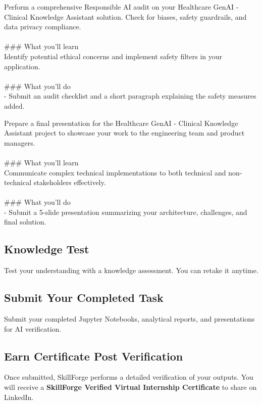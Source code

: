 \documentclass{article}
\begin{document}
Perform a comprehensive Responsible AI audit on your Healthcare GenAI - Clinical Knowledge Assistant solution. Check for biases, safety guardrails, and data privacy compliance. \\
 \\
### What you'll learn \\
Identify potential ethical concerns and implement safety filters in your application. \\
 \\
### What you'll do \\
- Submit an audit checklist and a short paragraph explaining the safety measures added.

Prepare a final presentation for the Healthcare GenAI - Clinical Knowledge Assistant project to showcase your work to the engineering team and product managers. \\
 \\
### What you'll learn \\
Communicate complex technical implementations to both technical and non-technical stakeholders effectively. \\
 \\
### What you'll do \\
- Submit a 5-slide presentation summarizing your architecture, challenges, and final solution.

\subsection*{Knowledge Test}
Test your understanding with a knowledge assessment. You can retake it anytime.\\

\subsection*{Submit Your Completed Task}
Submit your completed Jupyter Notebooks, analytical reports, and presentations for AI verification.\\

\subsection*{Earn Certificate Post Verification}
Once submitted, SkillForge performs a detailed verification of your outputs. You will receive a \textbf{SkillForge Verified Virtual Internship Certificate} to share on LinkedIn.\\
\end{document}
